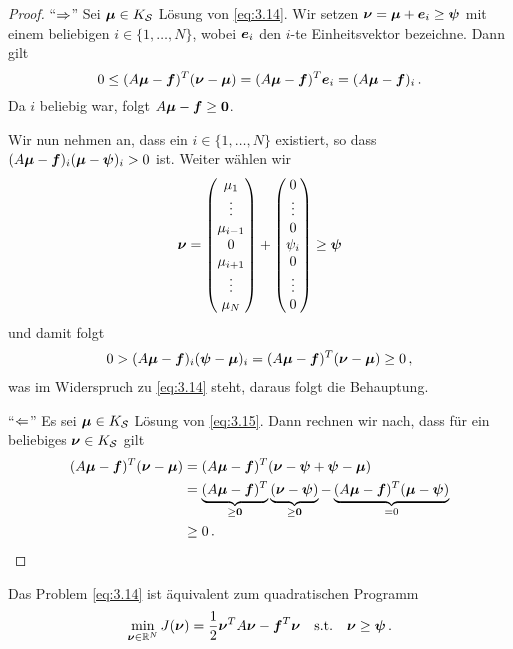 \begin{proof}
"`$\Rightarrow$"' Sei $\boldsymbol \mu \in K_{\mathcal S}$ Lösung von \eqref{eq:3.14}. Wir setzen $\boldsymbol\nu = \boldsymbol \mu +\boldsymbol e_i \ge \boldsymbol\psi$ mit einem beliebigen $i \in \{1,\ldots,N\}$, wobei $\boldsymbol e_i $ den $i$-te Einheitsvektor bezeichne. Dann gilt
\[
	0 \le (A\boldsymbol\mu - \boldsymbol f)^T (\boldsymbol\nu - \boldsymbol\mu) = (A\boldsymbol\mu - \boldsymbol f)^T \boldsymbol e_i = (A\boldsymbol \mu-\boldsymbol f)_i \, .
\]
Da $i$ beliebig war, folgt $A\boldsymbol\mu - \boldsymbol f\ge \boldsymbol 0$.

Wir nun nehmen an, dass ein $i \in \{1,\ldots,N\}$ existiert, so dass $(A\boldsymbol\mu - \boldsymbol f)_i (\boldsymbol\mu-\boldsymbol\psi)_i >0$ ist. Weiter wählen wir
\[
	\boldsymbol\nu = \begin{pmatrix}
				\mu_1 \\
				\vdots \\
				\mu_{i-1} \\
				0 \\
				\mu_{i+1}\\
				\vdots \\
				\mu_N
			\end{pmatrix} + 
			\begin{pmatrix}
				0 \\
				\vdots \\
				0\\
				\psi_i \\
				0\\
				\vdots \\
				0
			\end{pmatrix} \ge \boldsymbol\psi
\]
und damit folgt
\begin{align*}
	0 > (A\boldsymbol \mu - \boldsymbol f)_i (\boldsymbol\psi - \boldsymbol\mu)_i  = (A\boldsymbol\mu-\boldsymbol f)^T (\boldsymbol \nu-\boldsymbol \mu) \ge 0 \, ,
\end{align*}
was im Widerspruch zu \eqref{eq:3.14} steht, daraus folgt die Behauptung.

"`$\Leftarrow$"' Es sei $\boldsymbol \mu \in K_{\mathcal S}$ Lösung von \eqref{eq:3.15}. Dann rechnen wir nach, dass für ein beliebiges $\boldsymbol\nu \in K_{\mathcal S}$ gilt
\begin{align*}
	(A\boldsymbol \mu-\boldsymbol f)^T (\boldsymbol \nu- \boldsymbol\mu) & = (A\boldsymbol \mu-\boldsymbol f)^T (\boldsymbol \nu -\boldsymbol \psi + \boldsymbol\psi- \boldsymbol\mu) \\
	& = \underbrace{(A\boldsymbol \mu-\boldsymbol f)^T}_{\ge \boldsymbol 0} \underbrace{(\boldsymbol \nu -\boldsymbol \psi)}_{\ge \boldsymbol 0} -\underbrace{(A\boldsymbol \mu-\boldsymbol f)^T (\boldsymbol\mu-\boldsymbol\psi)}_{=0} \\
	& \ge 0\, . \qedhere
\end{align*}
\end{proof}


\begin{satz}\label{satz:3.12}
Das Problem \eqref{eq:3.14} ist äquivalent zum quadratischen Programm
\begin{align}\label{eq:3.16}
	\min_{\boldsymbol\nu \in \mathbb{R}^N} J(\boldsymbol\nu) = \frac 1 2 \boldsymbol \nu^T A \boldsymbol \nu - \boldsymbol f^T \boldsymbol \nu\quad \text{s.t.} \quad \boldsymbol \nu \ge \boldsymbol \psi \, .
\end{align}
\end{satz}

